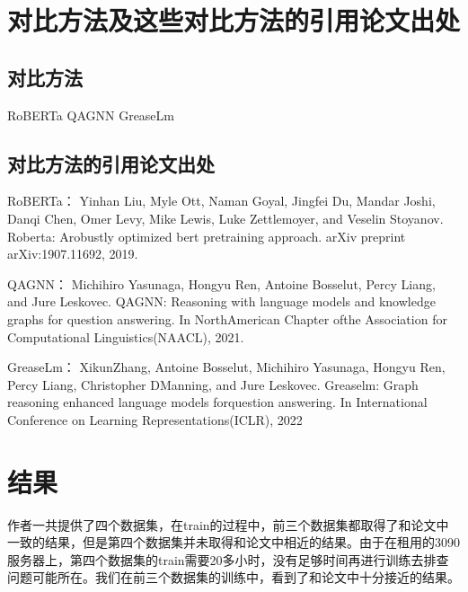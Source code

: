 \section{对比方法及这些对比方法的引用论文出处}
\subsection{对比方法}
RoBERTa QAGNN GreaseLm
\subsection{对比方法的引用论文出处}
RoBERTa：  Yinhan Liu, Myle Ott, Naman Goyal, Jingfei Du, Mandar Joshi, Danqi Chen, Omer Levy, Mike Lewis, Luke Zettlemoyer, and Veselin Stoyanov. Roberta: Arobustly optimized bert pretraining approach. arXiv preprint arXiv:1907.11692, 2019.

QAGNN：  Michihiro Yasunaga, Hongyu Ren, Antoine Bosselut, Percy Liang, and Jure Leskovec. QAGNN: Reasoning with language models and knowledge graphs for question answering. In NorthAmerican Chapter ofthe Association for Computational Linguistics(NAACL), 2021.

GreaseLm： XikunZhang, Antoine Bosselut, Michihiro Yasunaga, Hongyu Ren, Percy Liang, Christopher DManning, and Jure Leskovec. Greaselm: Graph reasoning enhanced language models forquestion answering. In International Conference on Learning Representations(ICLR), 2022

\section{结果}
作者一共提供了四个数据集，在train的过程中，前三个数据集都取得了和论文中一致的结果，但是第四个数据集并未取得和论文中相近的结果。由于在租用的3090服务器上，第四个数据集的train需要20多小时，没有足够时间再进行训练去排查问题可能所在。我们在前三个数据集的训练中，看到了和论文中十分接近的结果。

